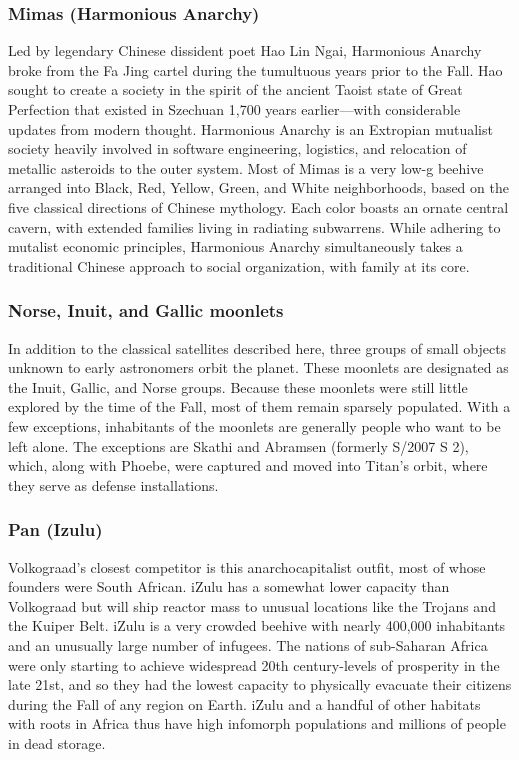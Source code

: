 \subsubsection{Mimas (Harmonious Anarchy)} \label{sec:mimas-harm-anarchy} 

Led by legendary Chinese dissident poet Hao Lin Ngai, Harmonious Anarchy broke from the Fa Jing cartel during the tumultuous years prior to the Fall. Hao sought to create a society in the spirit of the ancient Taoist state of Great Perfection that existed in Szechuan 1,700 years earlier—with considerable updates from modern thought. Harmonious Anarchy is an Extropian mutualist society heavily involved in software engineering, logistics, and relocation of metallic asteroids to the outer system. Most of Mimas is a very low-g beehive arranged into Black, Red, Yellow, Green, and White neighborhoods, based on the five classical directions of Chinese mythology. Each color boasts an ornate central cavern, with extended families living in radiating subwarrens. While adhering to mutalist economic principles, Harmonious Anarchy simultaneously takes a traditional Chinese approach to social organization, with family at its core. 

\subsubsection{Norse, Inuit, and Gallic moonlets} \label{sec:norse-inuit-gallic} 

In addition to the classical satellites described here, three groups of small objects unknown to early astronomers orbit the planet. These moonlets are designated as the Inuit, Gallic, and Norse groups. Because these moonlets were still little explored by the time of the Fall, most of them remain sparsely populated. With a few exceptions, inhabitants of the moonlets are generally people who want to be left alone. The exceptions are Skathi and Abramsen (formerly S/2007 S 2), which, along with Phoebe, were captured and moved into Titan's orbit, where they serve as defense installations. 

\subsubsection{Pan (Izulu)} \label{sec:pan-izulu} 

Volkograad's closest competitor is this anarchocapitalist outfit, most of whose founders were South African. iZulu has a somewhat lower capacity than Volkograad but will ship reactor mass to unusual locations like the Trojans and the Kuiper Belt. iZulu is a very crowded beehive with nearly 400,000 inhabitants and an unusually large number of infugees. The nations of sub-Saharan Africa were only starting to achieve widespread 20th century-levels of prosperity in the late 21st, and so they had the lowest capacity to physically evacuate their citizens during the Fall of any region on Earth. iZulu and a handful of other habitats with roots in Africa thus have high infomorph populations and millions of people in dead storage. 

